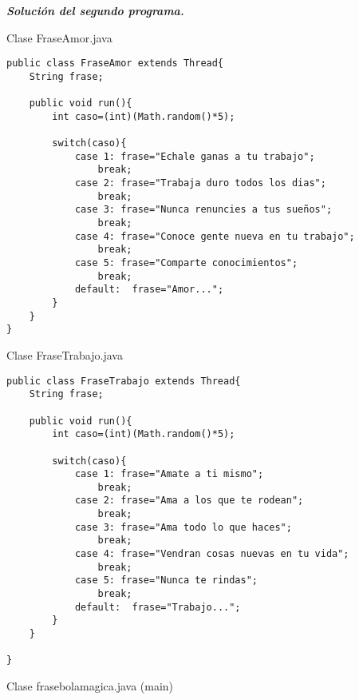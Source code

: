 \textbf{\textit{Solución del segundo programa.}}

\begin{center}
Clase FraseAmor.java
\end{center}

\begin{verbatim}
public class FraseAmor extends Thread{
    String frase;
    
    public void run(){
        int caso=(int)(Math.random()*5);
        
        switch(caso){
            case 1: frase="Echale ganas a tu trabajo";
                break;
            case 2: frase="Trabaja duro todos los dias";
                break;
            case 3: frase="Nunca renuncies a tus sueños";
                break;
            case 4: frase="Conoce gente nueva en tu trabajo";
                break;
            case 5: frase="Comparte conocimientos";
                break;
            default:  frase="Amor...";
        }
    }
}
\end{verbatim} \vspace{1cm}

\begin{center}
Clase FraseTrabajo.java
\end{center}

\begin{verbatim}
public class FraseTrabajo extends Thread{
    String frase;
    
    public void run(){
        int caso=(int)(Math.random()*5);
        
        switch(caso){
            case 1: frase="Amate a ti mismo";
                break;
            case 2: frase="Ama a los que te rodean";
                break;
            case 3: frase="Ama todo lo que haces";
                break;
            case 4: frase="Vendran cosas nuevas en tu vida";
                break;
            case 5: frase="Nunca te rindas";
                break;
            default:  frase="Trabajo...";
        }
    }
    
}
\end{verbatim} \vspace{1cm}

\begin{center}
Clase frasebolamagica.java (main)
\end{center}

